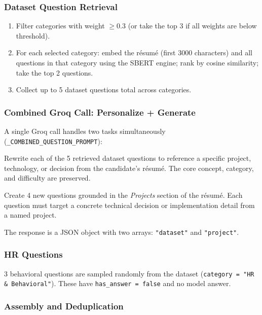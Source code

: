 \documentclass[12pt,a4paper]{article}
\begin{document}
\subsubsection{Dataset Question Retrieval}

\begin{enumerate}[leftmargin=2em]
  \item Filter categories with weight $\geq 0.3$ (or take the top 3 if all weights are below threshold).
  \item For each selected category: embed the r\'esum\'e (first 3000 characters) and all questions in that category using the SBERT engine; rank by cosine similarity; take the top 2 questions.
  \item Collect up to 5 dataset questions total across categories.
\end{enumerate}

\subsubsection{Combined Groq Call: Personalize + Generate}

A single Groq call handles two tasks simultaneously (\texttt{\_COMBINED\_QUESTION\_PROMPT}):

\begin{description}[leftmargin=2em]
  \item[Task 1 --- Personalize] Rewrite each of the 5 retrieved dataset questions to reference a specific project, technology, or decision from the candidate's r\'esum\'e. The core concept, category, and difficulty are preserved.
  \item[Task 2 --- Generate] Create 4 new questions grounded in the \textit{Projects} section of the r\'esum\'e. Each question must target a concrete technical decision or implementation detail from a named project.
\end{description}

The response is a JSON object with two arrays: \texttt{"dataset"} and \texttt{"project"}.

\subsubsection{HR Questions}

3 behavioral questions are sampled randomly from the dataset (\texttt{category = "HR \& Behavioral"}). These have \texttt{has\_answer = false} and no model answer.

\subsubsection{Assembly and Deduplication}
\end{document}
